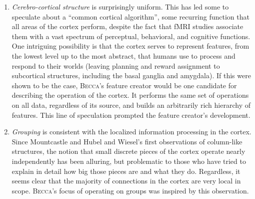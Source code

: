 \begin{enumerate}
\item {\em Cerebro-cortical structure} is surprisingly uniform. This has led some to speculate about a ``common cortical algorithm'', some recurring function that all areas of the cortex perform, despite the fact that fMRI studies associate them with a vast spectrum of perceptual, behavioral, and cognitive functions. One intriguing possibility is that the cortex serves to represent features, from the lowest level up to the most abstract, that humans use to process and respond to their worlds (leaving planning and reward assignment to subcortical structures, including the basal ganglia and amygdala). If this were shown to be the case, \textsc{Becca}'s feature creator would be one candidate for describing the operation of the cortex. It performs the same set of operations on all data, regardless of its source, and builds an arbitrarily rich hierarchy of features. This line of speculation prompted the feature creator's development.

\item {\em Grouping} is consistent with the localized information processing in the cortex. Since Mountcastle and Hubel and Wiesel's first observations of column-like structures, the notion that small discrete pieces of the cortex operate nearly independently has been alluring, but problematic to those who have tried to explain in detail how big those pieces are and what they do. Regardless, it seems clear that the majority of connections in the cortex are very local in scope. \textsc{Becca}'s focus of operating on groups was inspired by this observation. 
  
\end{enumerate}